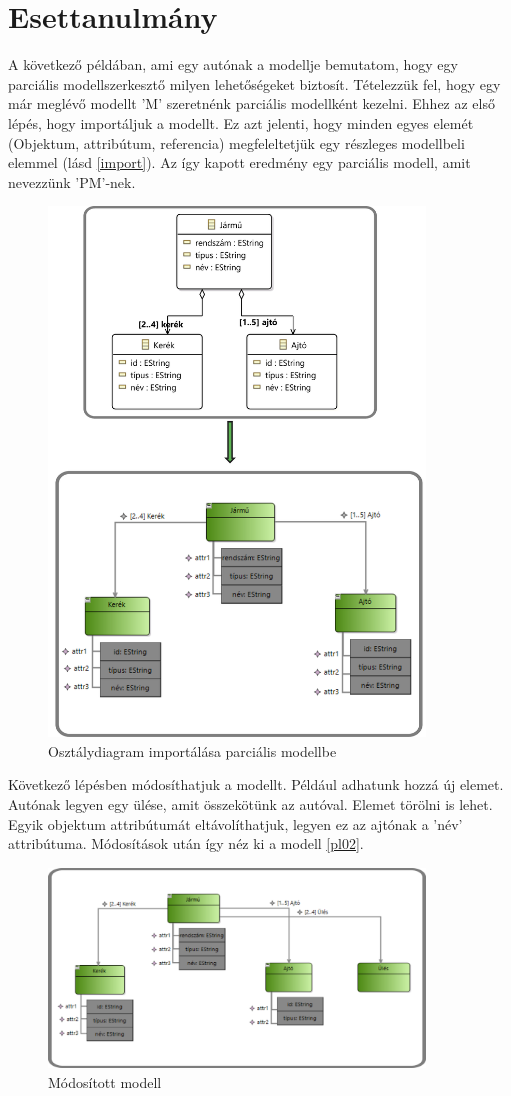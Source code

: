 \section{Esettanulmány}
A következő példában, ami egy autónak a modellje bemutatom, hogy egy parciális modellszerkesztő milyen lehetőségeket biztosít. Tételezzük fel, hogy egy már meglévő modellt 'M' szeretnénk parciális modellként kezelni. Ehhez az első lépés, hogy importáljuk a modellt. Ez azt jelenti, hogy minden egyes elemét (Objektum, attribútum, referencia) megfeleltetjük egy részleges modellbeli elemmel (lásd \autoref{import}). Az így kapott eredmény egy parciális modell, amit nevezzünk 'PM'-nek.
\begin{figure}[!ht]
	\centering
	\includegraphics[width=100mm]{figures/pl01.pdf}
	\caption{Osztálydiagram importálása parciális modellbe} 
	\label{import}
\end{figure}
\par
Következő lépésben módosíthatjuk a modellt. Például adhatunk hozzá új elemet. Autónak legyen egy ülése, amit összekötünk az autóval. Elemet törölni is lehet. Egyik objektum attribútumát eltávolíthatjuk, legyen ez az ajtónak a 'név' attribútuma. Módosítások után így néz ki a modell \autoref{pl02}.
\begin{figure}[!ht]
	\centering
	\includegraphics[width=100mm]{figures/pl02.pdf}
	\caption{Módosított modell} 
	\label{pl02}
\end{figure}
